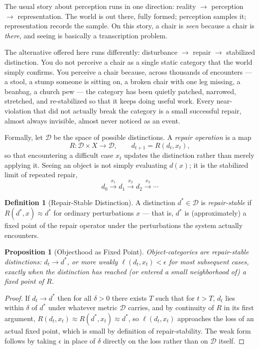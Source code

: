 \documentclass[11pt]{article}
\theoremstyle{plain}
\newtheorem{proposition}[theorem]{Proposition}
\theoremstyle{definition}
\newtheorem{definition}[theorem]{Definition}
\theoremstyle{remark}
\begin{document}
The usual story about perception runs in one direction: reality $\to$ perception $\to$ representation. The world is out there, fully formed; perception samples it; representation records the sample. On this story, a chair is \emph{seen} because a chair is \emph{there}, and seeing is basically a transcription problem.

The alternative offered here runs differently: disturbance $\to$ repair $\to$ stabilized distinction. You do not perceive a chair as a single static category that the world simply confirms. You perceive a chair because, across thousands of encounters --- a stool, a stump someone is sitting on, a broken chair with one leg missing, a beanbag, a church pew --- the category has been quietly patched, narrowed, stretched, and re-stabilized so that it keeps doing useful work. Every near-violation that did not actually break the category is a small successful repair, almost always invisible, almost never noticed as an event.

Formally, let $\mathcal{D}$ be the space of possible distinctions. A \emph{repair operation} is a map
\[
R : \mathcal{D} \times X \to \mathcal{D}, \qquad d_{t+1} = R(d_t, x_t),
\]
so that encountering a difficult case $x_t$ updates the distinction rather than merely applying it. Seeing an object is not simply evaluating $d(x)$; it is the stabilized limit of repeated repair,
\[
d_0 \xrightarrow{\,x_1\,} d_1 \xrightarrow{\,x_2\,} d_2 \xrightarrow{\,x_3\,} \cdots
\]

\begin{definition}[Repair-Stable Distinction]
A distinction $d^\ast \in \mathcal{D}$ is \emph{repair-stable} if $R(d^\ast, x) \approx d^\ast$ for ordinary perturbations $x$ --- that is, $d^\ast$ is (approximately) a fixed point of the repair operator under the perturbations the system actually encounters.
\end{definition}

\begin{proposition}[Objecthood as Fixed Point]
Object-categories are repair-stable distinctions: $d_t \to d^\ast$, or more weakly $\ell(d_t, x_t) < \epsilon$ for most subsequent cases, exactly when the distinction has reached (or entered a small neighborhood of) a fixed point of $R$.
\end{proposition}

\begin{proof}
If $d_t \to d^\ast$ then for all $\delta>0$ there exists $T$ such that for $t>T$, $d_t$ lies within $\delta$ of $d^\ast$ under whatever metric $\mathcal{D}$ carries, and by continuity of $R$ in its first argument, $R(d_t,x_t) \approx R(d^\ast,x_t) \approx d^\ast$, so $\ell(d_t,x_t)$ approaches the loss of an actual fixed point, which is small by definition of repair-stability. The weak form follows by taking $\epsilon$ in place of $\delta$ directly on the loss rather than on $\mathcal{D}$ itself.
\end{proof}
\end{document}
